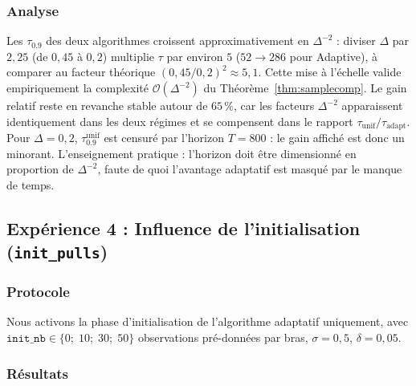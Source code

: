 \documentclass[10.5pt,a4paper]{article}
\begin{document}
\subsubsection{Analyse}

Les $\tau_{0.9}$ des deux algorithmes croissent
approximativement en $\Delta^{-2}$ : diviser $\Delta$ par $2{,}25$
(de $0{,}45$ à $0{,}2$) multiplie $\tau$ par environ $5$
($52\to 286$ pour Adaptive), à comparer au facteur théorique
$(0{,}45/0{,}2)^2\approx 5{,}1$. Cette mise à l'échelle valide
empiriquement la complexité $\mathcal{O}(\Delta^{-2})$ du
Théorème~\ref{thm:samplecomp}. Le gain relatif reste en revanche stable
autour de $65\,\%$, car les facteurs $\Delta^{-2}$ apparaissent
identiquement dans les deux régimes et se compensent dans le rapport
$\tau_{\text{unif}}/\tau_{\text{adapt}}$. Pour $\Delta=0{,}2$,
$\tau_{0.9}^{\text{unif}}$ est censuré par l'horizon $T=800$ : le gain
affiché est donc un minorant. L'enseignement pratique : l'horizon doit
être dimensionné en proportion de $\Delta^{-2}$, faute de quoi
l'avantage adaptatif est masqué par le manque de temps.

\subsection{Expérience 4 : Influence de l'initialisation (\texttt{init\_pulls})}
\subsubsection{Protocole}

Nous activons la phase d'initialisation de l'algorithme adaptatif
uniquement, avec $\texttt{init\_nb} \in \{0;\; 10;\; 30;\; 50\}$
observations pré-données par bras, $\sigma = 0{,}5$, $\delta = 0{,}05$.

\subsubsection{Résultats}
\end{document}
